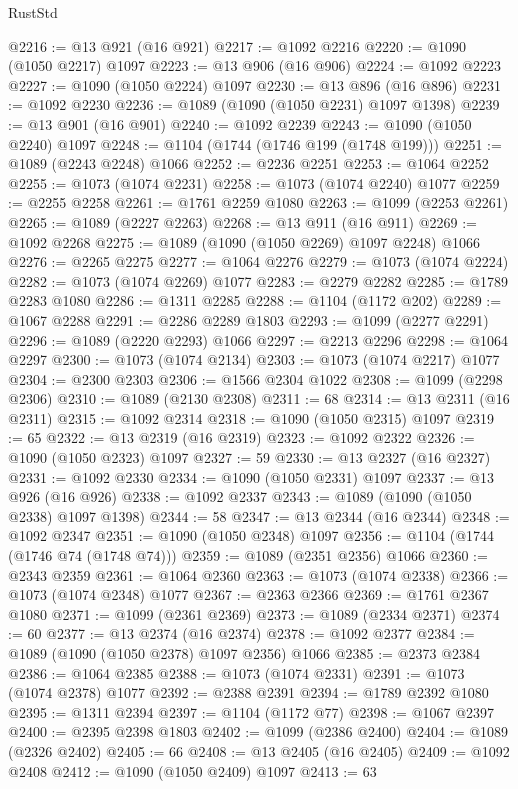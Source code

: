\begin{lexlean}{RustStd}
\begin{coremodule}
{\begin{coremodule}
{{{{{{{{{{{{{{@2216 := @13 @921 (@16 @921)
@2217 := @1092 @2216
@2220 := @1090 (@1050 @2217) @1097
@2223 := @13 @906 (@16 @906)
@2224 := @1092 @2223
@2227 := @1090 (@1050 @2224) @1097
@2230 := @13 @896 (@16 @896)
@2231 := @1092 @2230
@2236 := @1089 (@1090 (@1050 @2231) @1097 @1398)
@2239 := @13 @901 (@16 @901)
@2240 := @1092 @2239
@2243 := @1090 (@1050 @2240) @1097
@2248 := @1104 (@1744 (@1746 @199 (@1748 @199)))
@2251 := @1089 (@2243 @2248) @1066
@2252 := @2236 @2251
@2253 := @1064 @2252
@2255 := @1073 (@1074 @2231)
@2258 := @1073 (@1074 @2240) @1077
@2259 := @2255 @2258
@2261 := @1761 @2259 @1080
@2263 := @1099 (@2253 @2261)
@2265 := @1089 (@2227 @2263)
@2268 := @13 @911 (@16 @911)
@2269 := @1092 @2268
@2275 := @1089 (@1090 (@1050 @2269) @1097 @2248) @1066
@2276 := @2265 @2275
@2277 := @1064 @2276
@2279 := @1073 (@1074 @2224)
@2282 := @1073 (@1074 @2269) @1077
@2283 := @2279 @2282
@2285 := @1789 @2283 @1080
@2286 := @1311 @2285
@2288 := @1104 (@1172 @202)
@2289 := @1067 @2288
@2291 := @2286 @2289 @1803
@2293 := @1099 (@2277 @2291)
@2296 := @1089 (@2220 @2293) @1066
@2297 := @2213 @2296
@2298 := @1064 @2297
@2300 := @1073 (@1074 @2134)
@2303 := @1073 (@1074 @2217) @1077
@2304 := @2300 @2303
@2306 := @1566 @2304 @1022
@2308 := @1099 (@2298 @2306)
@2310 := @1089 (@2130 @2308)
@2311 := 68
@2314 := @13 @2311 (@16 @2311)
@2315 := @1092 @2314
@2318 := @1090 (@1050 @2315) @1097
@2319 := 65
@2322 := @13 @2319 (@16 @2319)
@2323 := @1092 @2322
@2326 := @1090 (@1050 @2323) @1097
@2327 := 59
@2330 := @13 @2327 (@16 @2327)
@2331 := @1092 @2330
@2334 := @1090 (@1050 @2331) @1097
@2337 := @13 @926 (@16 @926)
@2338 := @1092 @2337
@2343 := @1089 (@1090 (@1050 @2338) @1097 @1398)
@2344 := 58
@2347 := @13 @2344 (@16 @2344)
@2348 := @1092 @2347
@2351 := @1090 (@1050 @2348) @1097
@2356 := @1104 (@1744 (@1746 @74 (@1748 @74)))
@2359 := @1089 (@2351 @2356) @1066
@2360 := @2343 @2359
@2361 := @1064 @2360
@2363 := @1073 (@1074 @2338)
@2366 := @1073 (@1074 @2348) @1077
@2367 := @2363 @2366
@2369 := @1761 @2367 @1080
@2371 := @1099 (@2361 @2369)
@2373 := @1089 (@2334 @2371)
@2374 := 60
@2377 := @13 @2374 (@16 @2374)
@2378 := @1092 @2377
@2384 := @1089 (@1090 (@1050 @2378) @1097 @2356) @1066
@2385 := @2373 @2384
@2386 := @1064 @2385
@2388 := @1073 (@1074 @2331)
@2391 := @1073 (@1074 @2378) @1077
@2392 := @2388 @2391
@2394 := @1789 @2392 @1080
@2395 := @1311 @2394
@2397 := @1104 (@1172 @77)
@2398 := @1067 @2397
@2400 := @2395 @2398 @1803
@2402 := @1099 (@2386 @2400)
@2404 := @1089 (@2326 @2402)
@2405 := 66
@2408 := @13 @2405 (@16 @2405)
@2409 := @1092 @2408
@2412 := @1090 (@1050 @2409) @1097
@2413 := 63
}}}}}}}}}}}}}}
\end{coremodule}}
\end{coremodule}
\end{lexlean}
